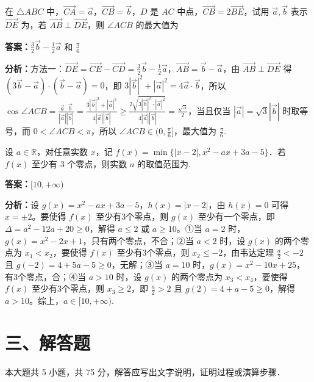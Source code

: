 \begin{question}[points=5]
在 $\triangle ABC$ 中，$\overrightarrow{CA}=\vec{a}$，$\overrightarrow{CB}=\vec{b}$，$D$ 是 $AC$ 中点，$\overrightarrow{CB}=2\overrightarrow{BE}$，试用 $\vec{a},\vec{b}$ 表示 $\overrightarrow{DE}$ 为，若 $\overrightarrow{AB}\perp\overrightarrow{DE}$，则 $\angle ACB$ 的最大值为
\begin{solution}
\textbf{答案：}$\frac{3}{2}\vec{b}-\frac{1}{2}\vec{a}$ 和 $\frac{\pi}{6}$

\textbf{分析：}方法一：$\overrightarrow{DE}=\overrightarrow{CE}-\overrightarrow{CD}=\frac{3}{2}\vec{b}-\frac{1}{2}\vec{a}$，$\overrightarrow{AB}=\vec{b}-\vec{a}$，由 $\overrightarrow{AB}\perp\overrightarrow{DE}$ 得 $(3\vec{b}-\vec{a})\cdot(\vec{b}-\vec{a})=0$，即 $3|\vec{b}|^2+|\vec{a}|^2=4\vec{a}\cdot\vec{b}$，所以 $\cos\angle ACB=\frac{\vec{a}\cdot\vec{b}}{|\vec{a}||\vec{b}|}=\frac{3|\vec{b}|^2+|\vec{a}|^2}{4|\vec{a}||\vec{b}|}\ge\frac{2\sqrt{3|\vec{b}|^2\cdot|\vec{a}|^2}}{4|\vec{a}||\vec{b}|}=\frac{\sqrt{3}}{2}$，当且仅当 $|\vec{a}|=\sqrt{3}|\vec{b}|$ 时取等号，而 $0<\angle ACB<\pi$，所以 $\angle ACB\in(0,\frac{\pi}{6}]$，最大值为 $\frac{\pi}{6}$.
\end{solution}
\end{question}

\begin{question}[points=5]
设 $a\in\mathbb{R}$，对任意实数 $x$，记 $f(x)=\min\{|x-2|, x^2-ax+3a-5\}$．若 $f(x)$ 至少有 3 个零点，则实数 $a$ 的取值范围为.
\fillin[{$[10,+\infty)$}]
\begin{solution}
\textbf{答案：}$[10,+\infty)$

\textbf{分析：}设 $g(x)=x^2-ax+3a-5$，$h(x)=|x-2|$，由 $h(x)=0$ 可得 $x=\pm2$。要使得 $f(x)$ 至少有3个零点，则 $g(x)$ 至少有一个零点，即 $\Delta=a^2-12a+20\ge0$，解得 $a\le2$ 或 $a\ge10$。①当 $a=2$ 时，$g(x)=x^2-2x+1$，只有两个零点，不合；②当 $a<2$ 时，设 $g(x)$ 的两个零点为 $x_1<x_2$，要使得 $f(x)$ 至少有3个零点，则 $x_2\le-2$，由韦达定理 $\frac{a}{2}<-2$ 且 $g(-2)=4+5a-5\ge0$，无解；③当 $a=10$ 时，$g(x)=x^2-10x+25$，有3个零点，合；④当 $a>10$ 时，设 $g(x)$ 的两个零点为 $x_3<x_4$，要使得 $f(x)$ 至少有3个零点，则 $x_3\ge2$，即 $\frac{a}{2}>2$ 且 $g(2)=4+a-5\ge0$，解得 $a>10$。综上，$a\in[10,+\infty)$.
\end{solution}
\end{question}

\section*{三、解答题}
本大题共 5 小题，共 75 分，解答应写出文字说明，证明过程或演算步骤．

